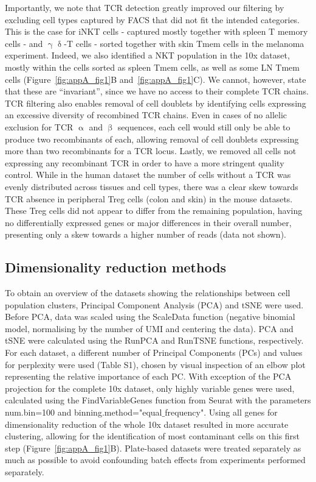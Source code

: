 Importantly, we note that TCR detection greatly improved our filtering by excluding cell types captured by FACS that did not fit the intended categories. This is the case for iNKT cells - captured mostly together with spleen T memory cells - and ${\upgamma\updelta}$-T cells - sorted together with skin Tmem cells in the melanoma experiment. Indeed, we also identified a NKT population in the 10x dataset, mostly within the cells sorted as spleen Tmem cells, as well as some LN Tmem cells (Figure~\ref{fig:appA_fig1}B and~\ref{fig:appA_fig1}C). We cannot, however, state that these are “invariant”, since we have no access to their complete TCR chains. TCR filtering also enables removal of cell doublets by identifying cells expressing an excessive diversity of recombined TCR chains. Even in cases of no allelic exclusion for TCR ${\upalpha}$ and ${\upbeta}$ sequences, each cell would still only be able to produce two recombinants of each, allowing removal of cell doublets expressing more than two recombinants for a TCR locus. Lastly, we removed all cells not expressing any recombinant TCR in order to have a more stringent quality control. While in the human dataset the number of cells without a TCR was evenly distributed across tissues and cell types, there was a clear skew towards TCR absence in peripheral Treg cells (colon and skin) in the mouse datasets. These Treg cells did not appear to differ from the remaining population, having no differentially expressed genes or major differences in their overall number, presenting only a skew towards a higher number of reads (data not shown).

\subsection{Dimensionality reduction methods}
To obtain an overview of the datasets showing the relationships between cell population clusters, Principal Component Analysis (PCA) and tSNE were used. Before PCA, data was scaled using the ScaleData function (negative binomial model, normalising by the number of UMI and centering the data). PCA and tSNE were calculated using the RunPCA and RunTSNE functions, respectively. For each dataset, a different number of Principal Components (PCs) and values for perplexity were used (Table S1), chosen by visual inspection of an elbow plot representing the relative importance of each PC. With exception of the PCA projection for the complete 10x dataset, only highly variable genes were used, calculated using the FindVariableGenes function from Seurat with the parameters num.bin=100 and binning.method="equal${\_}$frequency". Using all genes for dimensionality reduction of the whole 10x dataset resulted in more accurate clustering, allowing for the identification of most contaminant cells on this first step (Figure~\ref{fig:appA_fig1}B). Plate-based datasets were treated separately as much as possible to avoid confounding batch effects from experiments performed separately.

